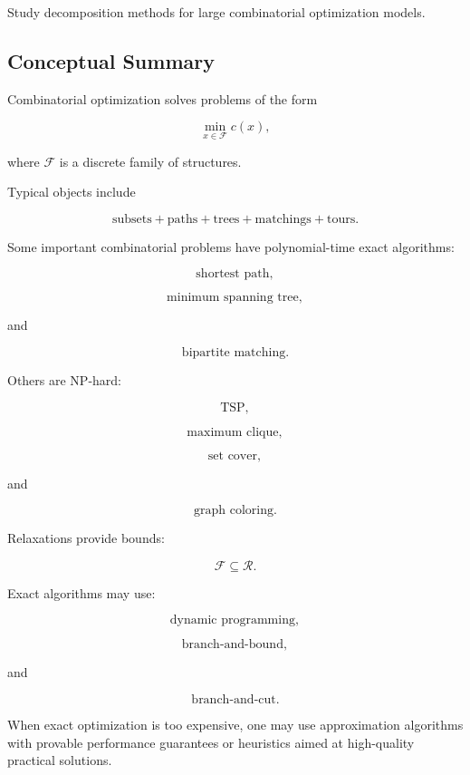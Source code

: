 \begin{exercise}[4]
Study decomposition methods for large combinatorial optimization models.
\end{exercise}

\subsection{Conceptual Summary}
\label{subsec:combinatorial-optimization-summary}

Combinatorial optimization solves problems of the form

\[
\boxed{
\min_{x\in\mathcal{F}}
c(x),
}
\]

where \(\mathcal{F}\) is a discrete family of structures.

Typical objects include

\[
\boxed{
\text{subsets}
+
\text{paths}
+
\text{trees}
+
\text{matchings}
+
\text{tours}.
}
\]

Some important combinatorial problems have polynomial-time exact
algorithms:

\[
\boxed{
\text{shortest path},
}
\]

\[
\boxed{
\text{minimum spanning tree},
}
\]

and

\[
\boxed{
\text{bipartite matching}.
}
\]

Others are NP-hard:

\[
\boxed{
\text{TSP},
}
\]

\[
\boxed{
\text{maximum clique},
}
\]

\[
\boxed{
\text{set cover},
}
\]

and

\[
\boxed{
\text{graph coloring}.
}
\]

Relaxations provide bounds:

\[
\boxed{
\mathcal{F}
\subseteq
\mathcal{R}.
}
\]

Exact algorithms may use:

\[
\boxed{
\text{dynamic programming},
}
\]

\[
\boxed{
\text{branch-and-bound},
}
\]

and

\[
\boxed{
\text{branch-and-cut}.
}
\]

When exact optimization is too expensive, one may use approximation
algorithms with provable performance guarantees or heuristics aimed at
high-quality practical solutions.

